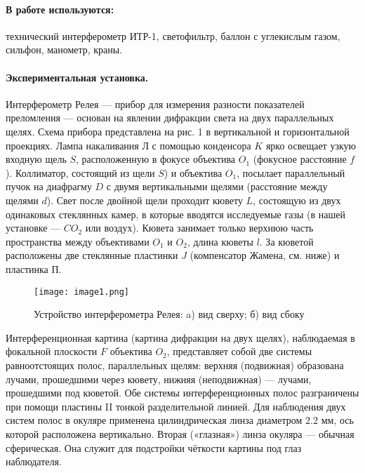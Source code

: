 \documentclass[a4paper,12pt]{article} %
\begin{document}
\paragraph{В работе используются:}технический интерферометр ИТР-1, светофильтр, баллон с углекислым газом, сильфон, манометр, краны.

\paragraph{Экспериментальная установка.}Интерферометр Релея — прибор для измерения разности показателей преломления — основан на явлении дифракции света на двух параллельных щелях. Схема прибора представлена на рис. 1 в вертикальной и горизонтальной проекциях. Лампа накаливания $\text{Л}$ с помощью конденсора $K$ ярко освещает узкую входную щель $S$, расположенную в фокусе объектива $O_1$ (фокусное расстояние $f$). Коллиматор, состоящий из щели $S$) и объектива $O_1$, посылает параллельный пучок на диафрагму $D$ с двумя вертикальными щелями (расстояние между щелями $d$). Свет после двойной щели проходит кювету $L$, состоящую из двух одинаковых стеклянных камер, в которые вводятся исследуемые газы (в нашей установке — $CO_2$ или воздух). Кювета занимает только верхнюю часть пространства между объективами $O_1$ и $O_2$, длина кюветы $l$. За кюветой расположены две стеклянные пластинки $J$ (компенсатор Жамена, см. ниже) и пластинка $\text{П}$.

\begin{figure}[h]
    \begin{center}
        \texttt{[image: image1.png]}
    \end{center}
    \caption{Устройство интерферометра Релея: a) вид сверху; б) вид сбоку}
    \label{img1}
\end{figure}

Интерференционная картина (картина дифракции на двух щелях), наблюдаемая в фокальной плоскости $F$ объектива $O_2$, представляет собой две системы равноотстоящих полос, параллельных щелям: верхняя (подвижная) образована лучами, прошедшими через кювету, нижняя (неподвижная) — лучами, прошедшими под кюветой. Обе системы интерференционных полос разграничены при помощи пластины II тонкой разделительной линией. Для наблюдения двух систем полос в окуляре применена цилиндрическая линза диаметром $2.2\text{ мм}$, ось которой расположена вертикально. Вторая («глазная») линза окуляра — обычная сферическая. Она служит для подстройки чёткости картины под глаз наблюдателя.
\end{document}
